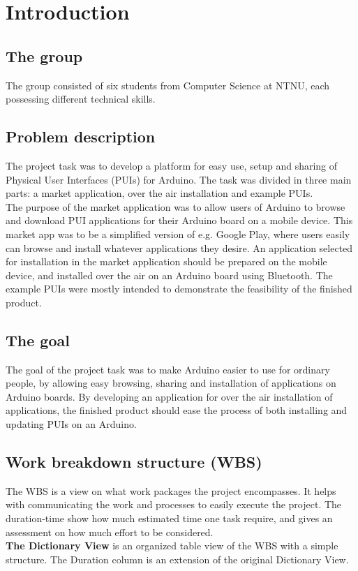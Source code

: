 \section{Introduction}
\subsection{The group}
The group consisted of six students from Computer Science at NTNU, each possessing different technical skills.

\subsection{Problem description}
The project task was to develop a platform for easy use, setup and sharing of Physical User Interfaces (PUIs) for Arduino. The task was divided in three main parts: a market application, over the air installation and example PUIs.\\
\newline
The purpose of the market application was to allow users of Arduino to browse and download PUI applications for their Arduino board on a mobile device. This market app was to be a simplified version of e.g. Google Play, where users easily can browse and install whatever applications they desire. An application selected for installation in the market application should be prepared on the mobile device, and installed over the air on an Arduino board using Bluetooth. The example PUIs were mostly intended to demonstrate the feasibility of the finished product.

\subsection{The goal}
The goal of the project task was to make Arduino easier to use for ordinary people, by allowing easy browsing, sharing and installation of applications on Arduino boards. By developing an application for over the air installation of applications, the finished product should ease the process of both installing and updating PUIs on an Arduino.

\subsection{Work breakdown structure (WBS)}
The WBS is a view on what work packages the project encompasses. It helps with communicating the work and processes to easily execute the project. The duration-time show how much estimated time one task require, and gives an assessment on how much effort to be considered.\\
\newline
\textbf{The Dictionary View} is an organized table view of the WBS with a simple structure. The Duration column is an extension of the original Dictionary View.\\

